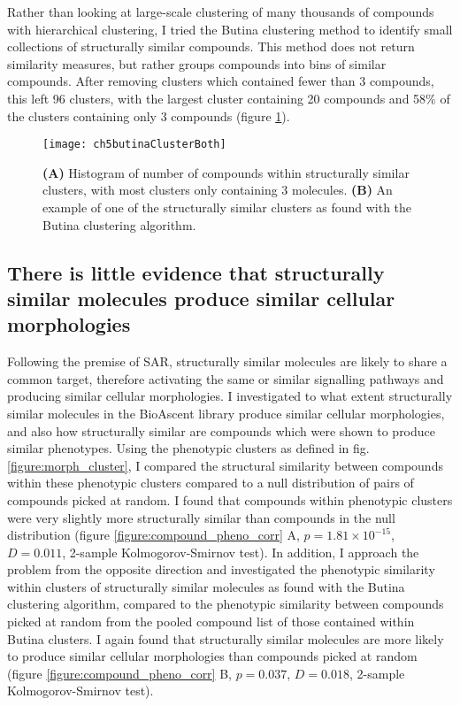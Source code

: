 \documentclass[a4paper,11pt,twoside,openright]{scrbook}
\begin{document}
Rather than looking at large-scale clustering of many thousands of compounds with hierarchical clustering, I tried the 
Butina clustering method to identify small collections of structurally similar compounds.
This method does not return similarity measures, but rather groups compounds into bins of similar compounds. 
\cite{Butina1999}
After removing clusters which contained fewer than 3 compounds, this left 96 clusters, with the largest cluster 
containing 20 compounds and 58\% of the clusters containing only 3 compounds (figure \ref{figure:butina_clusters}).

\begin{figure}
    \captionsetup{width=0.8\textwidth}
    \caption[Histogram of structural cluster sizes and example of molecules within a cluster]{
        \textbf{(A)} Histogram of number of compounds within structurally similar clusters, with most clusters only 
containing 3 molecules.
        \textbf{(B)} An example of one of the structurally similar clusters as found with the Butina clustering 
algorithm. 
}
    \texttt{[image: ch5butinaClusterBoth]}
    \label{figure:butina_clusters}
\end{figure}



\subsection{There is little evidence that structurally similar molecules produce similar cellular morphologies}

Following the premise of SAR, structurally similar molecules are likely to share a common target, therefore activating 
the same or similar signalling pathways and producing similar cellular morphologies.
I investigated to what extent structurally similar molecules in the BioAscent library produce similar cellular 
morphologies, and also how structurally similar are compounds which were shown to produce similar phenotypes.
Using the phenotypic clusters as defined in fig.\ref{figure:morph_cluster}, I compared the structural similarity 
between compounds within these phenotypic clusters compared to a null distribution of pairs of compounds picked at 
random.
I found that compounds within phenotypic clusters were very slightly more structurally similar than compounds in the 
null distribution (figure \ref{figure:compound_pheno_corr} A, $p=1.81\times10^{-15}$, $D=0.011$, 2-sample 
Kolmogorov-Smirnov test).
In addition, I approach the problem from the opposite direction and investigated the phenotypic similarity within 
clusters of structurally similar molecules as found with the Butina clustering algorithm, compared to the phenotypic 
similarity between compounds picked at random from the pooled compound list of those contained within Butina clusters.
I again found that structurally similar molecules are more likely to produce similar cellular morphologies than 
compounds picked at random (figure \ref{figure:compound_pheno_corr} B, $p=0.037$, $D=0.018$, 2-sample 
Kolmogorov-Smirnov test).
\end{document}
